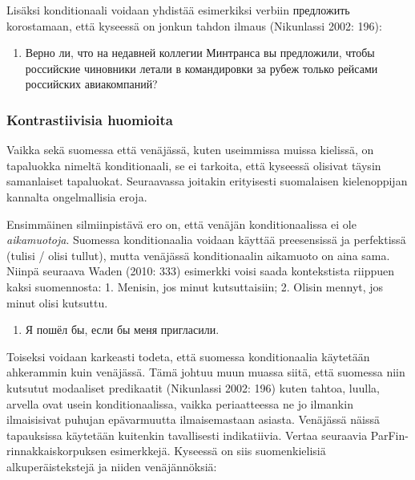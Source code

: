\documentclass[]{scrartcl}
\providecommand{\tightlist}{%
  \setlength{\itemsep}{0pt}\setlength{\parskip}{0pt}}
\begin{document}
Lisäksi konditionaali voidaan yhdistää esimerkiksi verbiin предложить
korostamaan, että kyseessä on jonkun tahdon ilmaus (Nikunlassi 2002:
196):

\begin{enumerate}
\def\labelenumi{(\arabic{enumi})}
\setcounter{enumi}{396}
\tightlist
\item
  Верно ли, что на недавней коллегии Минтранса вы предложили, чтобы
  российские чиновники летали в командировки за рубеж только рейсами
  российских авиакомпаний?
\end{enumerate}

\subsubsection{Kontrastiivisia
huomioita}\label{kontrastiivisia-huomioita-1}

Vaikka sekä suomessa että venäjässä, kuten useimmissa muissa kielissä,
on tapaluokka nimeltä konditionaali, se ei tarkoita, että kyseessä
olisivat täysin samanlaiset tapaluokat. Seuraavassa joitakin erityisesti
suomalaisen kielenoppijan kannalta ongelmallisia eroja.

Ensimmäinen silmiinpistävä ero on, että venäjän konditionaalissa ei ole
\emph{aikamuotoja}. Suomessa konditionaalia voidaan käyttää preesensissä
ja perfektissä (tulisi / olisi tullut), mutta venäjässä konditionaalin
aikamuoto on aina sama. Niinpä seuraava Waden (2010: 333) esimerkki
voisi saada kontekstista riippuen kaksi suomennosta: 1. Menisin, jos
minut kutsuttaisiin; 2. Olisin mennyt, jos minut olisi kutsuttu.

\begin{enumerate}
\def\labelenumi{(\arabic{enumi})}
\setcounter{enumi}{397}
\tightlist
\item
  Я пошёл бы, если бы меня пригласили.
\end{enumerate}

Toiseksi voidaan karkeasti todeta, että suomessa konditionaalia
käytetään ahkerammin kuin venäjässä. Tämä johtuu muun muassa siitä, että
suomessa niin kutsutut modaaliset predikaatit (Nikunlassi 2002: 196)
kuten tahtoa, luulla, arvella ovat usein konditionaalissa, vaikka
periaatteessa ne jo ilmankin ilmaisisivat puhujan epävarmuutta
ilmaisemastaan asiasta. Venäjässä näissä tapauksissa käytetään kuitenkin
tavallisesti indikatiivia. Vertaa seuraavia ParFin-rinnakkaiskorpuksen
esimerkkejä. Kyseessä on siis suomenkielisiä alkuperäistekstejä ja
niiden venäjännöksiä:
\end{document}
